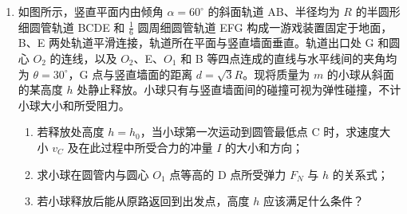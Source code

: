\documentclass[\gkver]{gaokaozhenti}
\begin{document}
\begin{enumerate}
\begin{enumerate}
	\item
	最大位移值 $x$；
	\item
	与斜面间的动摩擦因数；
	\item
	从最高点返回到出发点的过程中重力的平均功率 $P$。
\end{enumerate}



\item
如图所示，竖直平面内由倾角 $\alpha = 60^{\circ}$ 的斜面轨道 AB、半径均为 $R$ 的半圆形细圆管轨道 BCDE 和 $\frac{1}{6}$ 圆周细圆管轨道 EFG 构成一游戏装置固定于地面，B、E 两处轨道平滑连接，轨道所在平面与竖直墙面垂直。轨道出口处 G 和圆心 $O_{2}$ 的连线，以及 $O_{2}$、E、$O_{1}$ 和 B 等四点连成的直线与水平线间的夹角均为 $\theta = 30^{\circ}$，G 点与竖直墙面的距离 $d = \sqrt{3}R$。现将质量为 $m$ 的小球从斜面的某高度 $h$ 处静止释放。小球只有与竖直墙面间的碰撞可视为弹性碰撞，不计小球大小和所受阻力。

\begin{enumerate}
	\item
	若释放处高度 $h = h_{0}$，当小球第一次运动到圆管最低点 C 时，求速度大小 $v_{C}$ 及在此过程中所受合力的冲量 $I$ 的大小和方向；
	\item
	求小球在圆管内与圆心 $O_{1}$ 点等高的 D 点所受弹力 $F_{N}$ 与 $h$ 的关系式；
	\item
	若小球释放后能从原路返回到出发点，高度 $h$ 应该满足什么条件？
\end{enumerate}


\end{enumerate}
\end{document}

